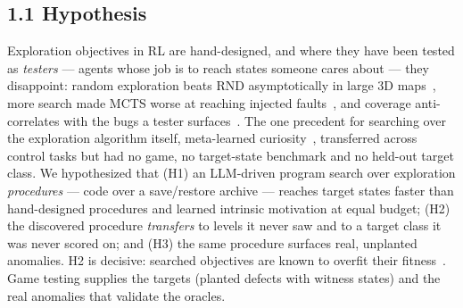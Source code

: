 \subsection*{1.1 Hypothesis}
Exploration objectives in RL are hand-designed, and where they have been tested as \emph{testers} --- agents whose job is to reach
states someone cares about --- they disappoint: random exploration beats RND asymptotically in large 3D maps~\cite{goexplore-reach},
more search made MCTS worse at reaching injected faults~\cite{ariyurek-mcts}, and coverage anti-correlates with the bugs a tester
surfaces~\cite{ccpt}. The one precedent for searching over the exploration algorithm itself, meta-learned curiosity~\cite{alet},
transferred across control tasks but had no game, no target-state benchmark and no held-out target class. We hypothesized that (H1)
an LLM-driven program search over exploration \emph{procedures} --- code over a save/restore archive --- reaches target states faster
than hand-designed procedures and learned intrinsic motivation at equal budget; (H2) the discovered procedure \emph{transfers} to
levels it never saw and to a target class it was never scored on; and (H3) the same procedure surfaces real, unplanted anomalies.
H2 is decisive: searched objectives are known to overfit their fitness~\cite{dmmultiagent}. Game testing supplies the targets
(planted defects with witness states) and the real anomalies that validate the oracles.

